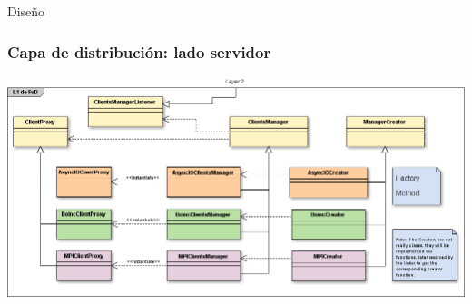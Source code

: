 \begin{subsection}{Diseño}

	\begin{frame}\frametitle{Capa de distribución: lado servidor}
		\begin{center}
			\includegraphics[scale=0.31]{images/diseno-servidor-fud.png}
		\end{center}
	\end{frame}
	

\end{subsection}
